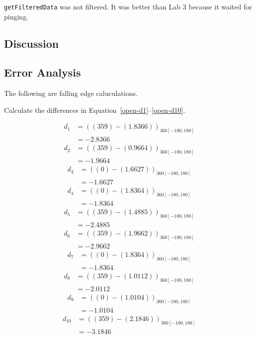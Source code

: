 \documentclass[twocolumn]{article}
\begin{document}
{\tt getFilteredData} was not filtered. It was better than Lab 3\cite{alexneil3} because it waited for pinging.

\cite{lab4}

\subsection{Discussion}

\subsection{Error Analysis}

The following are falling edge caluculations.

Calculate the differences in Equation~\ref{open-d1}--\ref{open-d10}.

\begin{align}
d_{1} &= ((359) - (1.8366))_{360[-180,180]} \nonumber\\
 &= -2.8366 \label{open-d1}
\end{align}
\begin{align}
d_{2} &= ((359) - (0.9664))_{360[-180,180]} \nonumber\\
 &= -1.9664 \label{open-d2}
\end{align}
\begin{align}
d_{3} &= ((0) - (1.6627))_{360[-180,180]} \nonumber\\
 &= -1.6627 \label{open-d3}
\end{align}
\begin{align}
d_{4} &= ((0) - (1.8364))_{360[-180,180]} \nonumber\\
 &= -1.8364 \label{open-d4}
\end{align}
\begin{align}
d_{5} &= ((359) - (1.4885))_{360[-180,180]} \nonumber\\
 &= -2.4885 \label{open-d5}
\end{align}
\begin{align}
d_{6} &= ((359) - (1.9662))_{360[-180,180]} \nonumber\\
 &= -2.9662 \label{open-d6}
\end{align}
\begin{align}
d_{7} &= ((0) - (1.8364))_{360[-180,180]} \nonumber\\
 &= -1.8364 \label{open-d7}
\end{align}
\begin{align}
d_{8} &= ((359) - (1.0112))_{360[-180,180]} \nonumber\\
 &= -2.0112 \label{open-d8}
\end{align}
\begin{align}
d_{9} &= ((0) - (1.0104))_{360[-180,180]} \nonumber\\
 &= -1.0104 \label{open-d9}
\end{align}
\begin{align}
d_{10} &= ((359) - (2.1846))_{360[-180,180]} \nonumber\\
 &= -3.1846 \label{open-d10}
\end{align}
\end{document}
